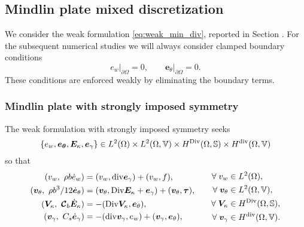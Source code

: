 \subsection{Mindlin plate mixed discretization}
We consider the weak formulation \eqref{eq:weak_min_div}, reported in Section . For the subsequent numerical studies we will always consider clamped boundary conditions
\begin{equation}
e_w\vert_{\partial\Omega} = 0, \qquad \bm{e}_\theta\vert_{\partial\Omega}=0.
\end{equation}
These conditions are enforced weakly by eliminating the boundary terms.

\subsubsection{Mindlin plate with strongly imposed symmetry}\label{sec:min_strong}
The weak formulation with strongly imposed symmetry seeks 
$$\{e_w, \bm{e}_{\bm{\theta}}, \bm{E}_{\kappa}, \bm{e}_{\gamma}\} \in L^2(\Omega) \times L^2(\Omega, \mathbb{V}) \times H^{\operatorname*{Div}}(\Omega, \mathbb{S}) \times H^{\operatorname{div}}(\Omega, \mathbb{V})$$
 so that 
\begin{equation}
\label{eq:weak_min_PH_strong}
\begin{aligned}
(v_w, \ \rho b \dot{e}_w) &= (v_w, \mathrm{div} \bm{e}_\gamma) + (v_w, f), \\ 
(\bm{v}_\theta, \ \rho b^3/12  \dot{\bm{e}}_\theta) &= (\bm{v}_\theta, \mathrm{Div} \bm{E}_\kappa + \bm{e}_\gamma) + (\bm{v}_\theta, \bm{\tau}), \\  
(\bm{V}_\kappa, \ \bm{\mathcal{C}}_{b} \dot{\bm{E}}_\kappa) &= -(\mathrm{Div} \bm{V}_\kappa,  \bm{e}_\theta), \\ 
(\bm{v}_\gamma, \ C_s \dot{\bm{e}}_\gamma) &= -(\mathrm{div} \bm{v}_\gamma, e_w ) + (\bm{v}_\gamma, \bm{e}_{\theta}), \\ 
\end{aligned} \qquad
\begin{aligned}
\forall\; v_w &\in L^2(\Omega), \\
\forall\; \bm{v}_\theta &\in L^2(\Omega, \mathbb{V}), \\
\forall\; \bm{V}_\kappa &\in H^{\operatorname*{Div}}(\Omega, \mathbb{S}), \\
\forall\; \bm{v}_\gamma &\in H^{\operatorname{div}}(\Omega, \mathbb{V}).
\end{aligned}
\end{equation}

